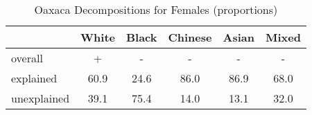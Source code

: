 \begin{table}[htbp]\centering
\caption{Oaxaca Decompositions for Females (proportions)}
\begin{tabular}{l*{5}{c}}
\hline\hline
          &    White&    Black&  Chinese&    Asian&    Mixed\\
\hline
overall   &     +    &    -     &     -    &    -     &     -    \\
explained &     60.9&     24.6&     86.0&     86.9&     68.0\\
unexplained&     39.1&     75.4&     14.0&     13.1&     32.0\\
\hline\hline
\end{tabular}
\label{tab:oaxaca_pct_female}
\end{table}
